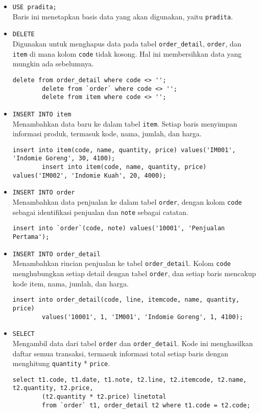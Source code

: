 \begin{itemize}
	\item \texttt{USE pradita;} \\ 
	Baris ini menetapkan basis data yang akan digunakan, yaitu \texttt{pradita}.
	
	\item \texttt{DELETE} \\ 
	Digunakan untuk menghapus data pada tabel \texttt{order\_detail}, \texttt{order}, dan \texttt{item} di mana kolom \texttt{code} tidak kosong. Hal ini membersihkan data yang mungkin ada sebelumnya.
	\begin{lstlisting}[style=sql]
		delete from order_detail where code <> '';
		delete from `order` where code <> '';
		delete from item where code <> '';
	\end{lstlisting}
	
	\item \texttt{INSERT INTO item} \\ 
	Menambahkan data baru ke dalam tabel \texttt{item}. Setiap baris menyimpan informasi produk, termasuk kode, nama, jumlah, dan harga.
	\begin{lstlisting}[style=sql]
		insert into item(code, name, quantity, price) values('IM001', 'Indomie Goreng', 30, 4100);
		insert into item(code, name, quantity, price) values('IM002', 'Indomie Kuah', 20, 4000);
	\end{lstlisting}
	
	\item \texttt{INSERT INTO order} \\ 
	Menambahkan data penjualan ke dalam tabel \texttt{order}, dengan kolom \texttt{code} sebagai identifikasi penjualan dan \texttt{note} sebagai catatan.
	\begin{lstlisting}[style=sql]
		insert into `order`(code, note) values('10001', 'Penjualan Pertama');
	\end{lstlisting}
	
	\item \texttt{INSERT INTO order\_detail} \\ 
	Menambahkan rincian penjualan ke tabel \texttt{order\_detail}. Kolom \texttt{code} menghubungkan setiap detail dengan tabel \texttt{order}, dan setiap baris mencakup kode item, nama, jumlah, dan harga.
	\begin{lstlisting}[style=sql]
		insert into order_detail(code, line, itemcode, name, quantity, price) 
		values('10001', 1, 'IM001', 'Indomie Goreng', 1, 4100);
	\end{lstlisting}
	
	\item \texttt{SELECT} \\ 
	Mengambil data dari tabel \texttt{order} dan \texttt{order\_detail}. Kode ini menghasilkan daftar semua transaksi, termasuk informasi total setiap baris dengan menghitung \texttt{quantity} * \texttt{price}.
	\begin{lstlisting}[style=sql]
		select t1.code, t1.date, t1.note, t2.line, t2.itemcode, t2.name, t2.quantity, t2.price, 
		(t2.quantity * t2.price) linetotal
		from `order` t1, order_detail t2 where t1.code = t2.code;
	\end{lstlisting}
\end{itemize}

